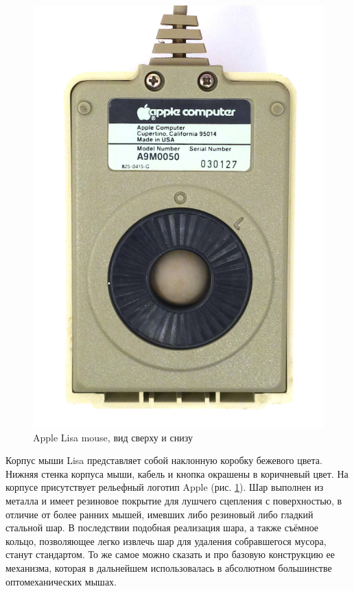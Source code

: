 \documentclass[11pt, a4paper]{article}
\begin{document}
\begin{figure}[h]
    \includegraphics[scale=0.7]{1983_apple_lisa_mouse/applebottom_60.jpg}
    \caption{Apple Lisa mouse, вид сверху и снизу}
    \label{fig:AppleLisaTopAndBottom}
\end{figure}

Корпус мыши Lisa представляет собой наклонную коробку бежевого цвета. Нижняя стенка корпуса мыши, кабель и кнопка окрашены в коричневый цвет. На корпусе присутствует рельефный логотип Apple (рис. \ref{fig:AppleLisaTopAndBottom}). Шар выполнен из металла и имеет резиновое покрытие для лушчего сцепления с поверхностью, в отличие от более ранних мышей, имевших либо резиновый либо гладкий стальной шар. В последствии подобная реализация шара, а также съёмное кольцо, позволяющее легко извлечь шар для удаления собравшегося мусора, станут стандартом. То же самое можно сказать и про базовую конструкцию ее механизма, которая в дальнейшем использовалась в абсолютном большинстве оптомеханических мышах.
\end{document}
